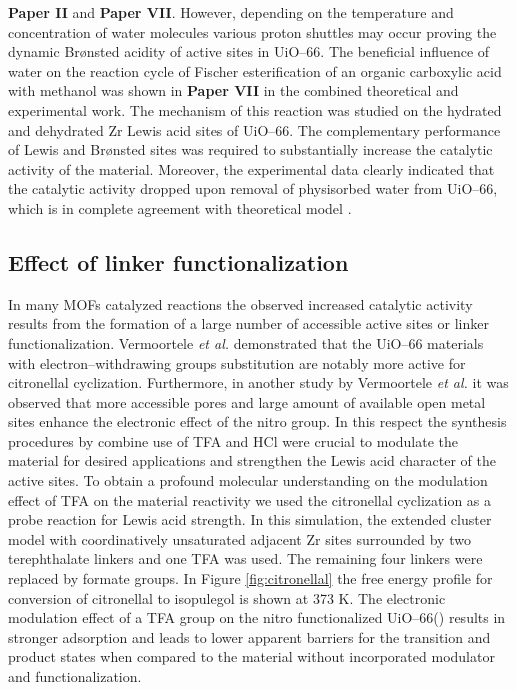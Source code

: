 \textbf{Paper II} and \textbf{Paper VII}. However, depending on the
temperature and concentration of water molecules various proton shuttles may
occur proving the dynamic Br\o{}nsted acidity of active sites in UiO--66. The
beneficial influence of water on the reaction cycle of Fischer esterification of
an organic carboxylic acid with methanol was shown in \textbf{Paper VII} in the combined theoretical and experimental work. The mechanism of this reaction was studied on the hydrated
and dehydrated Zr Lewis acid sites of UiO--66. The complementary performance of
Lewis and Br\o{}nsted sites was required to substantially increase the catalytic activity of the material. Moreover, the
experimental data clearly indicated that the catalytic activity dropped upon
removal of physisorbed water from UiO--66, which is in complete agreement with
theoretical model \cite{Caratelli2017}.


\subsection*{Effect of linker functionalization}
In many MOFs catalyzed reactions the observed increased catalytic activity
results from the formation of a large number of accessible active sites or
linker functionalization. Vermoortele \textit{et al.}\cite{Vermoortele2012}
demonstrated that the UiO--66 materials with electron--withdrawing groups
substitution are notably more active for citronellal cyclization. Furthermore,
in another study by Vermoortele \textit{et al.}\cite{Vermoortele2013} it was observed that more accessible pores and large amount of available open metal sites enhance the electronic
effect of the nitro group. In this respect the synthesis
procedures by combine use of TFA and HCl were crucial to modulate the material for desired
applications and strengthen the Lewis acid character of the active sites. To
obtain a profound molecular understanding on the modulation effect of TFA on the
material reactivity we used the citronellal cyclization as a probe reaction for
Lewis acid strength. In this simulation, the extended cluster model with
coordinatively unsaturated adjacent Zr sites surrounded by two terephthalate
linkers and one TFA was used. The remaining four linkers were replaced by
formate groups. In Figure \ref{fig:citronellal} the free energy profile for
conversion of citronellal to isopulegol is shown at 373 K. The
electronic modulation effect of a TFA group on the nitro functionalized
UiO--66() results in stronger adsorption and leads to lower apparent
barriers for the transition and product states when compared to the material
without incorporated modulator and functionalization.

